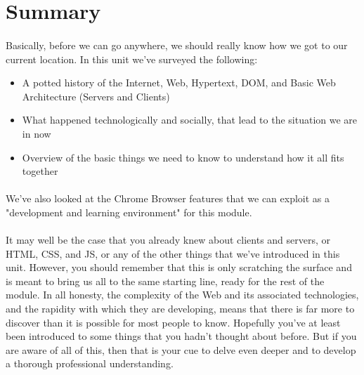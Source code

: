 \section{Summary}
\paragraph{} Basically, before we can go anywhere, we should really know how we got to our current location. In this unit we've surveyed the following:

\begin{itemize}
\item A potted history of the Internet, Web, Hypertext, DOM, and Basic Web Architecture (Servers and Clients)
\item What happened technologically and socially, that lead to the situation we are in now
\item Overview of the basic things we need to know to understand how it all fits together
\end{itemize}

\paragraph{} We've also looked at the Chrome Browser features that we can exploit as a "development and learning environment" for this module.
\paragraph{} It may well be the case that you already knew about clients and servers, or HTML, CSS, and JS, or any of the other things that we've introduced in this unit. However, you should remember that this is only scratching the surface and is meant to bring us all to the same starting line, ready for the rest of the module. In all honesty, the complexity of the Web and its associated technologies, and the rapidity with which they are developing, means that there is far more to discover than it is possible for most people to know. Hopefully you've at least been introduced to some things that you hadn't thought about before. But if you are aware of all of this, then that is your cue to delve even deeper and to develop a thorough professional understanding.
